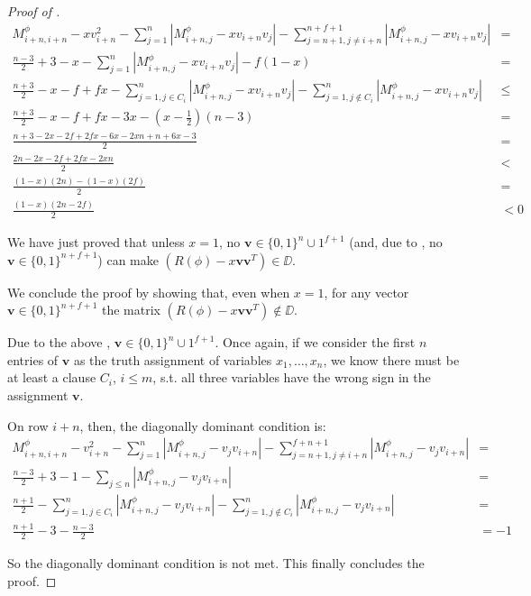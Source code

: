 \begin{proof}[Proof of ]
	\begin{align}
		M^\phi_{i+n,i+n} - x v_{i+n}^2 - \sum_{j = 1}^{n} |M^\phi_{i+n,j} - x v_{i+n} v_j| -  \sum_{j = n+1, j\neq i+n}^{n+f+1} |M^\phi_{i+n,j} - x v_{i+n} v_j| & = \\
		\frac{n-3}{2} + 3 - x -  \sum_{j = 1}^{n} |M^\phi_{i+n,j} - x v_{i+n} v_j| - f(1-x) & = \\
		\frac{n+3}{2} - x - f + fx -  \sum_{j=1,j\in C_i}^n |M^\phi_{i+n,j} - x v_{i+n} v_j| - \sum_{j=1, j\notin C_i}^n |M^\phi_{i+n,j} - x v_{i+n} v_j| & \leq \\
		\frac{n+3}{2} - x - f + fx - 3x - (x-\frac{1}{2})(n-3) & = \\
		\frac{n + 3 - 2x - 2f + 2fx - 6x - 2xn + n + 6x - 3}{2} & = \\
		\frac{2n - 2x - 2f + 2 fx - 2xn}{2} & < \\
		\frac{(1-x)(2n) - (1-x)(2f)}{2} & = \\
		\frac{(1-x)(2n-2f)}{2} & < 0
	\end{align}
	
We have just proved that unless $x=1$, no $\mathbf{v}\in\{0,1\}^{n}\cup 1^{f+1}$ (and, due to , no $\mathbf{v}\in\{0,1\}^{n+f+1}$) can make $(R(\phi) - x\mathbf{vv}^T)\in \DD$.

We conclude the proof by showing that, even when $x=1$, for any vector $\mathbf{v}\in \{0,1\}^{n+f+1}$ the matrix  $(R(\phi) - x\mathbf{vv}^T)\notin \DD$.

Due to the above , $\mathbf{v}\in\{0,1\}^n\cup 1^{f+1}$. Once again, if we consider the first $n$ entries of $\mathbf{v}$ as the truth assignment of variables $x_1, \dots, x_n$, we know there must be at least a clause $C_i$, $i\leq m$, s.t. all three variables have the wrong sign in the assignment $\mathbf{v}$. 

On row $i+n$, then, the diagonally dominant condition is:
\begin{align}
	M_{i+n, i+n}^\phi - v_{i+n}^2 - \sum_{j = 1}^n |M_{i+n, j}^\phi - v_j v_{i+n}| -  \sum_{j = n+1, j\neq i+n}^{f+n+1} |M_{i+n, j}^\phi - v_j v_{i+n}| & = \\
	\frac{n-3}{2} + 3 - 1 -  \sum_{j\leq n}|M_{i+n, j}^\phi - v_j v_{i+n}| & = \\
	\frac{n+1}{2} - \sum_{j=1, j \in C_i}^n |M_{i+n, j}^\phi - v_j v_{i+n}| - \sum_{j=1, j \notin C_i}^n |M_{i+n, j}^\phi - v_j v_{i+n}| & = \\
	\frac{n+1}{2} - 3 - \frac{n-3}{2} & = -1
\end{align}

So the diagonally dominant condition is not met.
This finally concludes the proof.

\end{proof}